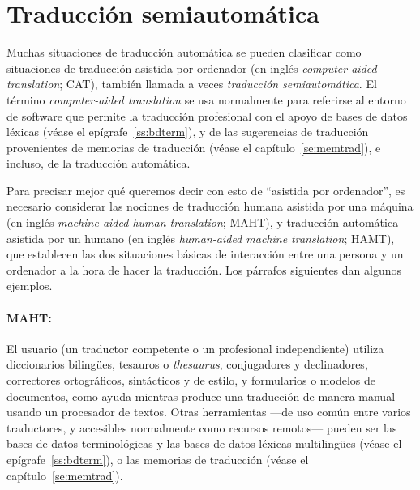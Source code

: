 \section{Traducción semiautomática} \label{se:cat} Muchas situaciones de traducción automática se pueden clasificar como situaciones de traducción asistida por ordenador (en inglés \emph{computer-aided translation}; CAT), también llamada a veces \emph{traducción semiautomática}. El término \emph{computer-aided translation} se usa normalmente para referirse al entorno de software que permite la traducción profesional con el apoyo de bases de datos léxicas (véase el epígrafe~\ref{ss:bdterm}), y de las sugerencias de traducción provenientes de memorias de traducción (véase el capítulo~\ref{se:memtrad}), e incluso, de la traducción automática. 

Para precisar mejor qué queremos decir con esto de ``asistida por ordenador'', es necesario considerar las nociones de traducción humana asistida por una máquina (en inglés \emph{machine-aided human translation}; MAHT), y traducción automática asistida por un humano (en inglés \emph{human-aided machine translation}; HAMT), que establecen las dos situaciones básicas de interacción entre una persona y un ordenador a la hora de hacer la traducción. Los párrafos siguientes dan algunos ejemplos. 

\paragraph{MAHT:} El usuario (un traductor competente o un profesional independiente) utiliza diccionarios bilingües, tesauros o \emph{thesaurus}, conjugadores y declinadores, correctores ortográficos, sintácticos y de estilo, y formularios o modelos de documentos, como ayuda mientras produce una traducción de manera manual usando un procesador de textos. Otras herramientas ---de uso común entre varios traductores, y accesibles normalmente como recursos remotos--- pueden ser las bases de datos terminológicas y las bases de datos léxicas multilingües (véase el epígrafe~\ref{ss:bdterm}), o las memorias de traducción (véase el capítulo~\ref{se:memtrad}). 

